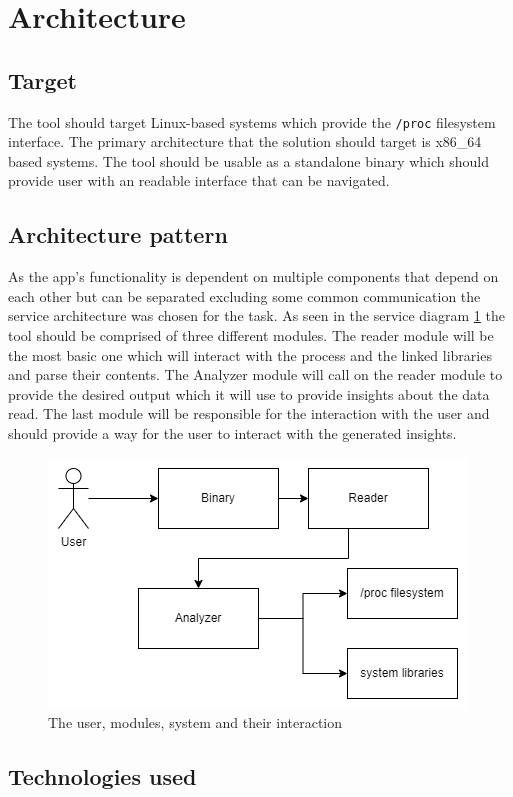 \section{Architecture}
\label{sec:architecture}

\subsection{Target}

The tool should target Linux-based systems which provide the \verb|/proc| filesystem interface. 
The primary architecture that the solution should target is x86\_64 based systems.
The tool should be usable as a standalone binary which should provide user with an readable interface that can be navigated.

\subsection{Architecture pattern}

As the app's functionality is dependent on multiple components that depend on each other but can be separated excluding some common communication the service architecture was chosen for the task.
As seen in the service diagram \ref{fig:modules} the tool should be comprised of three different modules.
The reader module will be the most basic one which will interact with the process and the linked libraries and parse their contents. The Analyzer module will call on the reader module to provide the desired output which it will use to provide insights about the data read. The last module will be responsible for the interaction with the user and should provide a way for the user to interact with the generated insights.

\begin{figure}
    \centering
    \includegraphics[width=0.5\linewidth]{modules.drawio.png}
    \caption{The user, modules, system and their interaction}
    \label{fig:modules}
\end{figure}

\subsection{Technologies used}

